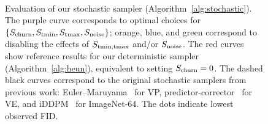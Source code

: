 {\begin{figure}[t]
{
}\\\hfill%
\hfill%
\hfill%
\hfill%
\caption{\label{fig:SdePlotNfe}%
Evaluation of our stochastic sampler (Algorithm~\ref{alg:stochastic}).
The purple curve corresponds to optimal choices for $\{S_\text{churn}, S_\text{tmin}, S_\text{tmax}, S_\text{noise}\}$; orange, blue, and green correspond to disabling the effects of $S_\text{tmin,tmax}$ and/or $S_\text{noise}$.
The red curves show reference results for our deterministic sampler (Algorithm~\ref{alg:heun}), equivalent to setting $S_\text{churn} = 0$.
The dashed black curves correspond to the original stochastic samplers from previous work: Euler--Maruyama~\cite{Song2021sde} for VP, predictor-corrector~\cite{Song2021sde} for VE, and iDDPM~\cite{Nichol2021a} for ImageNet-64.
The dots indicate lowest observed FID.
}
\vspace*{-2mm}
\end{figure}
}

